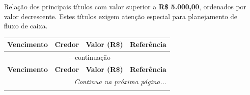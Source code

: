 \documentclass[12pt, a4paper]{article}
\begin{document}
Relação dos principais títulos com valor superior a \textbf{R\$ 5.000,00}, ordenados por valor decrescente. Estes títulos exigem atenção especial para planejamento de fluxo de caixa.

\begin{longtable}{c p{5.5cm} r p{3cm}}
    \toprule
    \rowcolor{tableHeader} \textbf{Vencimento} & \textbf{Credor} & \textbf{Valor (R\$)} & \textbf{Referência} \\
    \midrule
    \endfirsthead

    \multicolumn{4}{c}{{\tablename\ \thetable{} -- continuação}} \\
    \toprule
    \rowcolor{tableHeader} \textbf{Vencimento} & \textbf{Credor} & \textbf{Valor (R\$)} & \textbf{Referência} \\
    \midrule
    \endhead

    \midrule
    \multicolumn{4}{r}{\textit{Continua na próxima página...}} \\
    \endfoot

    \bottomrule
    \endlastfoot


\end{longtable}
\end{document}
